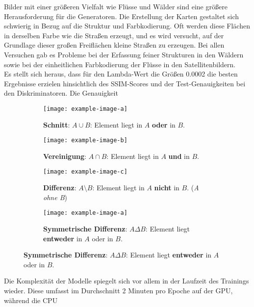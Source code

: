 Bilder mit einer größeren Vielfalt wie Flüsse und Wälder sind eine größere Herausforderung für die Generatoren. Die Erstellung der Karten gestaltet sich schwierig in Bezug auf die Struktur und Farbkodierung. Oft werden diese Flächen in derselben Farbe wie die Straßen erzeugt, und es wird versucht, auf der Grundlage dieser großen Freiflächen kleine Straßen zu erzeugen. Bei allen Versuchen gab es Probleme bei der Erfassung feiner Strukturen in den Wäldern sowie bei der einheitlichen Farbkodierung der Flüsse in den Satellitenbildern. 
\\\newline
Es stellt sich heraus, dass für den Lambda-Wert die Größen 0.0002 die besten Ergebnisse erzielen hinsichtlich des SSIM-Scores und der Test-Genauigkeiten bei den Diskriminatoren. 
Die Genauigkeit

\begin{figure}
    \begin{subfigure}[t]{.4\textwidth}
      \centering
      \texttt{[image: example-image-a]}
      \caption{\textbf{Schnitt}: $A \cup B$: Element liegt in $A$ \textbf{oder} in $B$.}
    \end{subfigure}
    \hfill
    \begin{subfigure}[t]{.4\textwidth}
      \centering
      \texttt{[image: example-image-b]}
      \caption{\textbf{Vereinigung}: $A \cap B$: Element liegt in $A$ \textbf{und} in $B$.}
    \end{subfigure}
  
    \medskip
  
    \begin{subfigure}[t]{.4\textwidth}
      \centering
      \texttt{[image: example-image-c]}
      \caption{\textbf{Differenz}: $A \setminus B$: Element liegt in $A$ \textbf{nicht} in $B$. (\textit{A ohne B})}
    \end{subfigure}
    \hfill
    \begin{subfigure}[t]{.4\textwidth}
      \centering
      \texttt{[image: example-image-a]}
      \caption{\textbf{Symmetrische Differenz}: $A \Delta B$: Element liegt \textbf{entweder} in $A$ oder in $B$.}
    \end{subfigure}
  \end{figure}


  Die Komplexität der Modelle spiegelt sich vor allem in der Laufzeit des Trainings wieder. Diese umfasst im Durchschnitt 2 Minuten pro Epoche auf der GPU, während die CPU 